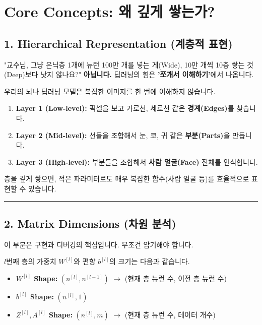 \documentclass[11pt,a4paper]{book}
\theoremstyle{definition}
\begin{document}
\section{Core Concepts: 왜 깊게 쌓는가?}

\subsection{1. Hierarchical Representation (계층적 표현)}
"교수님, 그냥 은닉층 1개에 뉴런 100만 개를 넣는 게(Wide), 10만 개씩 10층 쌓는 것(Deep)보다 낫지 않나요?"
\textbf{아닙니다.} 딥러닝의 힘은 \textbf{'쪼개서 이해하기'}에서 나옵니다.


\begin{analogybox}[title={사람의 얼굴 인식 과정}]
우리의 뇌나 딥러닝 모델은 복잡한 이미지를 한 번에 이해하지 않습니다.
\begin{enumerate}
    \item \textbf{Layer 1 (Low-level):} 픽셀을 보고 가로선, 세로선 같은 \textbf{경계(Edges)}를 찾습니다.
    \item \textbf{Layer 2 (Mid-level):} 선들을 조합해서 눈, 코, 귀 같은 \textbf{부분(Parts)}을 만듭니다.
    \item \textbf{Layer 3 (High-level):} 부분들을 조합해서 \textbf{사람 얼굴(Face)} 전체를 인식합니다.
\end{enumerate}
층을 깊게 쌓으면, 적은 파라미터로도 매우 복잡한 함수(사람 얼굴 등)를 효율적으로 표현할 수 있습니다.
\end{analogybox}

\vspace{0.5cm}\hrule\vspace{0.5cm}

\subsection{2. Matrix Dimensions (차원 분석)}
이 부분은 구현과 디버깅의 핵심입니다. 무조건 암기해야 합니다.

$l$번째 층의 가중치 $W^{[l]}$와 편향 $b^{[l]}$의 크기는 다음과 같습니다.
\begin{itemize}
    \item \textbf{$W^{[l]}$ Shape:} $(n^{[l]}, n^{[l-1]})$ $\rightarrow$ (현재 층 뉴런 수, 이전 층 뉴런 수)
    \item \textbf{$b^{[l]}$ Shape:} $(n^{[l]}, 1)$
    \item \textbf{$Z^{[l]}, A^{[l]}$ Shape:} $(n^{[l]}, m)$ $\rightarrow$ (현재 층 뉴런 수, 데이터 개수)
\end{itemize}
\end{document}
